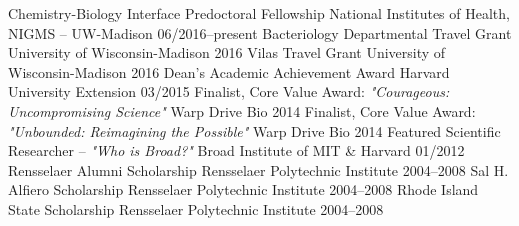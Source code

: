 

\begin{cvhonors}
  \cvhonor
    {Chemistry-Biology Interface Predoctoral Fellowship} %
    {National Institutes of Health, NIGMS -- UW-Madison} %
    {06/2016--present} %
  \cvhonor
    {Bacteriology Departmental Travel Grant} %
    {University of Wisconsin-Madison} %
    {2016} %
  \cvhonor
    {Vilas Travel Grant} %
    {University of Wisconsin-Madison} %
    {2016} %
  \cvhonor
    {Dean's Academic Achievement Award} %
    {Harvard University Extension} %
    {03/2015} %
  \cvhonor
    {Finalist, Core Value Award: \textit{"Courageous: Uncompromising Science"}} %
    {Warp Drive Bio} %
    {2014} %
  \cvhonor
    {Finalist, Core Value Award: \textit{"Unbounded: Reimagining the Possible"}} %
    {Warp Drive Bio} %
    {2014} %
  \cvhonor
    {Featured Scientific Researcher -- \textit{"Who is Broad?"}} %
    {Broad Institute of MIT \& Harvard} %
    {01/2012} %
  \cvhonor
    {Rensselaer Alumni Scholarship} %
    {Rensselaer Polytechnic Institute} %
    {2004--2008} %
  \cvhonor
    {Sal H. Alfiero Scholarship} %
    {Rensselaer Polytechnic Institute} %
    {2004--2008} %
  \cvhonor
    {Rhode Island State Scholarship} %
    {Rensselaer Polytechnic Institute} %
    {2004--2008} %
\end{cvhonors}